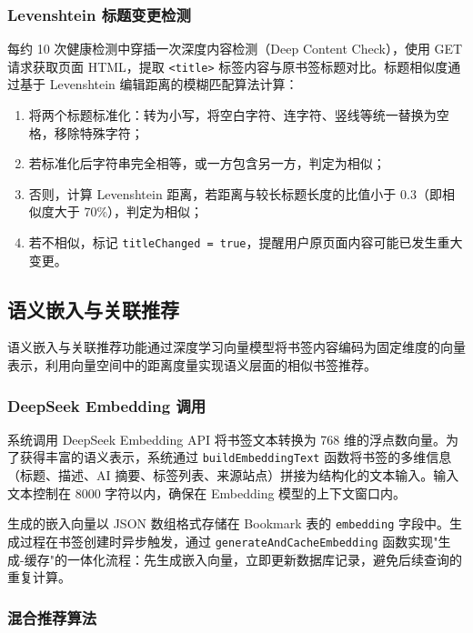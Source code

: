 \documentclass[12pt,a4paper]{ctexart}
\begin{document}
\subsubsection{Levenshtein 标题变更检测}

每约 10 次健康检测中穿插一次深度内容检测（Deep Content Check），使用 GET 请求获取页面 HTML，提取 \texttt{<title>} 标签内容与原书签标题对比。标题相似度通过基于 Levenshtein 编辑距离的模糊匹配算法计算：

\begin{enumerate}
  \item 将两个标题标准化：转为小写，将空白字符、连字符、竖线等统一替换为空格，移除特殊字符；
  \item 若标准化后字符串完全相等，或一方包含另一方，判定为相似；
  \item 否则，计算 Levenshtein 距离，若距离与较长标题长度的比值小于 0.3（即相似度大于 70\%），判定为相似；
  \item 若不相似，标记 \texttt{titleChanged = true}，提醒用户原页面内容可能已发生重大变更。
\end{enumerate}

\subsection{语义嵌入与关联推荐}

语义嵌入与关联推荐功能通过深度学习向量模型将书签内容编码为固定维度的向量表示，利用向量空间中的距离度量实现语义层面的相似书签推荐。

\subsubsection{DeepSeek Embedding 调用}

系统调用 DeepSeek Embedding API 将书签文本转换为 768 维的浮点数向量。为了获得丰富的语义表示，系统通过 \texttt{buildEmbeddingText} 函数将书签的多维信息（标题、描述、AI 摘要、标签列表、来源站点）拼接为结构化的文本输入。输入文本控制在 8000 字符以内，确保在 Embedding 模型的上下文窗口内。

生成的嵌入向量以 JSON 数组格式存储在 Bookmark 表的 \texttt{embedding} 字段中。生成过程在书签创建时异步触发，通过 \texttt{generateAndCacheEmbedding} 函数实现"生成-缓存"的一体化流程：先生成嵌入向量，立即更新数据库记录，避免后续查询的重复计算。

\subsubsection{混合推荐算法}
\end{document}
